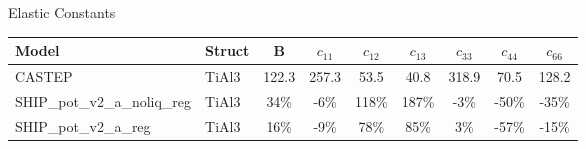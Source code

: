 \documentclass[preview]{standalone}
\begin{document}
\begin{center}
\textnormal{Elastic Constants} \\
\vspace{2mm}
\begin{tabular}{ l l c c c c c c c } \toprule 
Model & Struct & B & $c_{11}$ & $c_{12}$ & $c_{13}$ & $c_{33}$ & $c_{44}$ & $c_{66}$\\ \midrule 
CASTEP & TiAl3 & 122.3 & 257.3 & 53.5 & 40.8 & 318.9 & 70.5 & 128.2\\ 
SHIP\_pot\_v2\_a\_noliq\_reg & TiAl3 & 34\% & -6\% & 118\% & 187\% & -3\% & -50\% & -35\%\\ 
SHIP\_pot\_v2\_a\_reg & TiAl3 & 16\% & -9\% & 78\% & 85\% & 3\% & -57\% & -15\%\\ 
\end{tabular} \bigskip 
\end{center}
\end{document}
